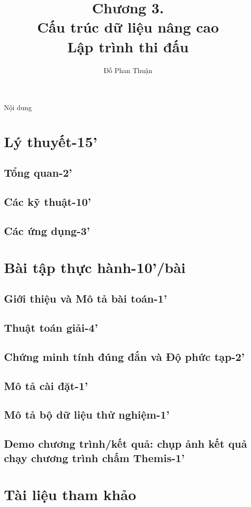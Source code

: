 \documentclass{beamer}
\title[]{{\huge \bf Chương 3.\\ Cấu trúc dữ liệu nâng cao} \\
\large Lập trình thi đấu}
\author[Đỗ Phan Thuận]{
Đỗ Phan Thuận%
}
\institute[]{
Bộ môn Khoa Học Máy Tính, Viện CNTT \& TT, \\
Trường Đại Học Bách Khoa Hà Nội.
}
\begin{document}
\begin{frame}
\titlepage
\end{frame}

\begin{frame}{Nội dung}
\tableofcontents
\end{frame}

\section{Lý thuyết-15'}
\subsection{Tổng quan-2'}
\subsection{Các kỹ thuật-10'}
\subsection{Các ứng dụng-3'}
\section{Bài tập thực hành-10'/bài}
\subsection{Giới thiệu và Mô tả bài toán-1'}
\subsection{Thuật toán giải-4'}
\subsection{Chứng minh tính đúng đắn và Độ phức tạp-2'}
\subsection{Mô tả cài đặt-1'}
\subsection{Mô tả bộ dữ liệu thử nghiệm-1'}
\subsection{Demo chương trình/kết quả: chụp ảnh kết quả chạy chương trình chấm Themis-1'}
\section*{Tài liệu tham khảo}
\end{document}
